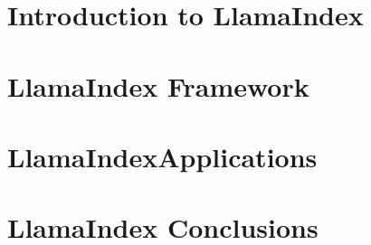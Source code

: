 \section[Intro]{Introduction to LlamaIndex}


\section[FRM]{LlamaIndex Framework}


\section[Apps]{LlamaIndexApplications}


\section[Concl]{LlamaIndex Conclusions}
